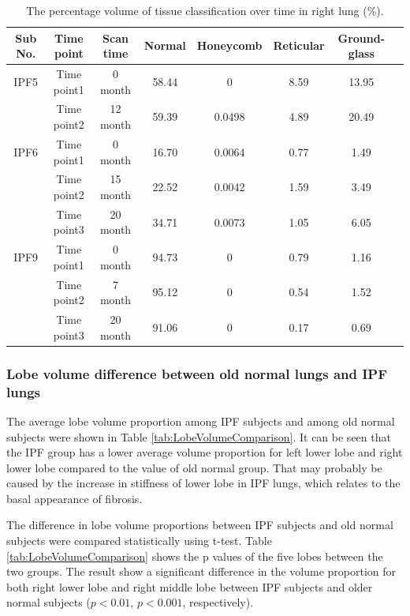 \begin{table}[htbp]
\centering
\caption{The percentage volume of tissue classification over time in right lung (\%).}
\label{tab:TissueVolumeRight}
\begin{tabular}{c c c c c c c c}
\hline
\bf{Sub No.} & \bf{Time point} & \bf{Scan time}	& \bf{Normal} &	\bf{Honeycomb} & \bf{Reticular} & \bf{Ground-glass}\\ 
\hline
IPF5 & Time point1 &  0 month & 58.44 & 0 & 8.59 & 13.95\\
\quad & Time point2 & 12 month & 59.39 & 0.0498 & 4.89 & 20.49\\
\hline
IPF6 & Time point1 &	0 month &	16.70 &	0.0064 & 0.77 & 1.49\\
\quad & Time point2 &	15 month &	22.52 &	0.0042 & 1.59 & 3.49\\
\quad & Time point3 &	20 month &	34.71 &	0.0073 & 1.05 & 6.05\\
\hline
IPF9 & Time point1 &	0 month &	94.73 &	0 & 0.79 & 1.16\\
\quad & Time point2 &	7 month &	95.12 &	0 & 0.54 & 1.52\\
\quad & Time point3 &	20 month &	91.06 &	0 & 0.17 & 0.69\\
\hline
\end{tabular}
\end{table}

\subsubsection{Lobe volume difference between old normal lungs and IPF lungs}
The average lobe volume proportion among IPF subjects and among old normal subjects were shown in Table \ref{tab:LobeVolumeComparison}. It can be seen that the IPF group has a lower average volume proportion for left lower lobe and right lower lobe compared to the value of old normal group. That may probably be caused by the increase in stiffness of lower lobe in IPF lungs, which relates to the basal appearance of fibrosis.

The difference in lobe volume proportions between IPF subjects and old normal subjects were compared statistically using t-test. Table \ref{tab:LobeVolumeComparison} shows the p values of the five lobes between the two groups. The result show a significant difference in the volume proportion for both right lower lobe and right middle lobe between IPF subjects and older normal subjects ($p<0.01$, $p<0.001$, respectively). 

